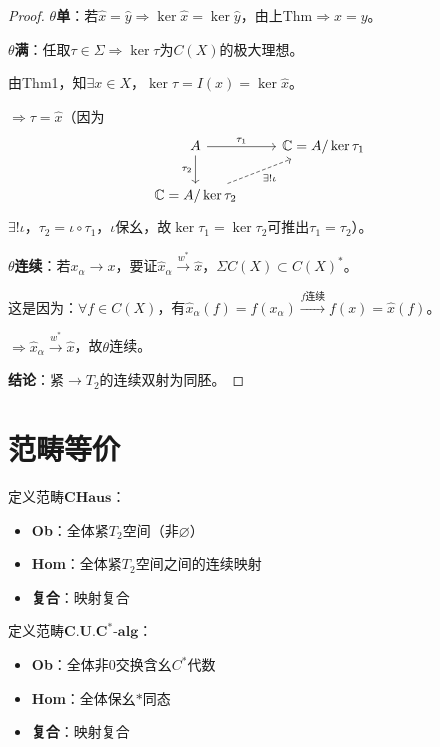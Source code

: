\documentclass[lang=cn,a4paper,newtx,section]{elegantbook}
\begin{document}
\begin{proof}
  \textbf{$\theta$单}：若$\hat{x} = \hat{y} \Rightarrow \ker\hat{x} = \ker\hat{y}$，由上Thm$\Rightarrow x = y$。
  
  \textbf{$\theta$满}：任取$\tau \in \Sigma \Rightarrow \ker\tau$为$C(X)$的极大理想。
  
  由Thm1，知$\exists x \in X$，$\ker\tau = I(x) = \ker\hat{x}$。
  
  $\Rightarrow \tau = \hat{x}$（因为
  \begin{equation*}
    \begin{tikzcd}
      A \arrow[r, "\tau_1"] \arrow[d, "\tau_2"'] & \mathbb{C} = A/\ker\tau_1 \\
      \mathbb{C} = A/\ker\tau_2 \arrow[ur, "\exists!\iota"', dashed]
    \end{tikzcd}
  \end{equation*}
  $\exists!\iota$，$\tau_2 = \iota \circ \tau_1$，$\iota$保幺，故$\ker\tau_1 = \ker\tau_2$可推出$\tau_1 = \tau_2$）。
  
  \textbf{$\theta$连续}：若$x_\alpha \to x$，要证$\hat{x}_\alpha \xrightarrow{w^*} \hat{x}$，$\Sigma C(X) \subset C(X)^*$。
  
  这是因为：$\forall f \in C(X)$，有$\hat{x}_\alpha(f) = f(x_\alpha) \xrightarrow{f\text{连续}} f(x) = \hat{x}(f)$。
  
  $\Rightarrow \hat{x}_\alpha \xrightarrow{w^*} \hat{x}$，故$\theta$连续。
  
  \textbf{结论}：紧$\to T_2$的连续双射为同胚。
\end{proof}

\section{范畴等价}

\begin{definition}[紧$T_2$空间范畴]
  定义范畴$\mathbf{CHaus}$：
  \begin{itemize}
    \item \textbf{Ob}：全体紧$T_2$空间（非$\varnothing$）
    \item \textbf{Hom}：全体紧$T_2$空间之间的连续映射
    \item \textbf{复合}：映射复合
  \end{itemize}
\end{definition}

\begin{definition}[交换$C^*$代数范畴]
  定义范畴$\mathbf{C.U.C^*\text{-}alg}$：
  \begin{itemize}
    \item \textbf{Ob}：全体非$0$交换含幺$C^*$代数
    \item \textbf{Hom}：全体保幺$*$同态
    \item \textbf{复合}：映射复合
  \end{itemize}
\end{definition}
\end{document}
